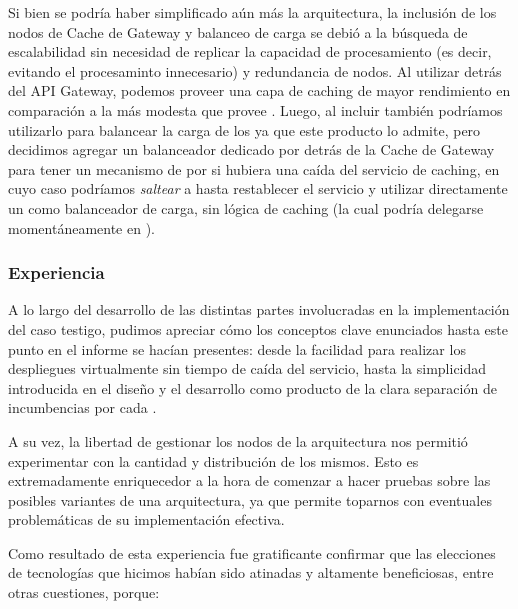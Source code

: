 Si bien se podría haber simplificado aún más la arquitectura, la inclusión de los nodos de Cache de Gateway y balanceo de carga se debió a la búsqueda de escalabilidad sin necesidad de replicar la capacidad de procesamiento (es decir, evitando el procesaminto innecesario) y redundancia de nodos. Al utilizar  detrás del API Gateway, podemos proveer una capa de caching de mayor rendimiento en comparación a la más modesta que provee . Luego, al incluir  también podríamos utilizarlo para balancear la carga de los  ya que este producto lo admite, pero decidimos agregar un balanceador dedicado por detrás de la Cache de Gateway para tener un mecanismo de  por si hubiera una caída del servicio de caching, en cuyo caso podríamos \textit{saltear} a  hasta restablecer el servicio y utilizar directamente un  como balanceador de carga, sin lógica de caching (la cual podría delegarse momentáneamente en ).

\subsubsection{Experiencia}
\label{caso-testigo:experiencia}

A lo largo del desarrollo de las distintas partes involucradas en la implementación del caso testigo, pudimos apreciar cómo los conceptos clave enunciados hasta este punto en el informe se hacían presentes: desde la facilidad para realizar los despliegues virtualmente sin tiempo de caída del servicio, hasta la simplicidad introducida en el diseño y el desarrollo como producto de la clara separación de incumbencias por cada .

A su vez, la libertad de gestionar los nodos de la arquitectura nos permitió experimentar con la cantidad y distribución de los mismos. Esto es extremadamente enriquecedor a la hora de comenzar a hacer pruebas sobre las posibles variantes de una arquitectura, ya que permite toparnos con eventuales problemáticas de su implementación efectiva.

Como resultado de esta experiencia fue gratificante confirmar que las elecciones de tecnologías que hicimos habían sido atinadas y altamente beneficiosas, entre otras cuestiones, porque:

